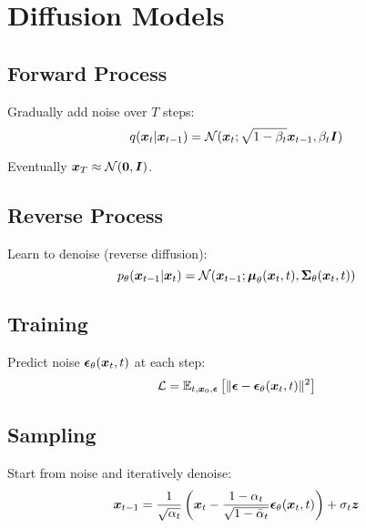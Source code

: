 
\section{Diffusion Models }
\label{sec:diffusion-models}

\subsection{Forward Process}

Gradually add noise over $T$ steps:
\begin{equation}
q(\boldsymbol{x}_t|\boldsymbol{x}_{t-1}) = \mathcal{N}(\boldsymbol{x}_t; \sqrt{1-\beta_t} \boldsymbol{x}_{t-1}, \beta_t \boldsymbol{I})
\end{equation}

Eventually $\boldsymbol{x}_T \approx \mathcal{N}(\boldsymbol{0}, \boldsymbol{I})$.

\subsection{Reverse Process}

Learn to denoise (reverse diffusion):
\begin{equation}
p_{\theta}(\boldsymbol{x}_{t-1}|\boldsymbol{x}_t) = \mathcal{N}(\boldsymbol{x}_{t-1}; \boldsymbol{\mu}_{\theta}(\boldsymbol{x}_t, t), \boldsymbol{\Sigma}_{\theta}(\boldsymbol{x}_t, t))
\end{equation}

\subsection{Training}

Predict noise $\boldsymbol{\epsilon}_{\theta}(\boldsymbol{x}_t, t)$ at each step:
\begin{equation}
\mathcal{L} = \mathbb{E}_{t, \boldsymbol{x}_0, \boldsymbol{\epsilon}}\left[\|\boldsymbol{\epsilon} - \boldsymbol{\epsilon}_{\theta}(\boldsymbol{x}_t, t)\|^2\right]
\end{equation}

\subsection{Sampling}

Start from noise and iteratively denoise:
\begin{equation}
\boldsymbol{x}_{t-1} = \frac{1}{\sqrt{\alpha_t}}\left(\boldsymbol{x}_t - \frac{1-\alpha_t}{\sqrt{1-\bar{\alpha}_t}}\boldsymbol{\epsilon}_{\theta}(\boldsymbol{x}_t, t)\right) + \sigma_t \boldsymbol{z}
\end{equation}

